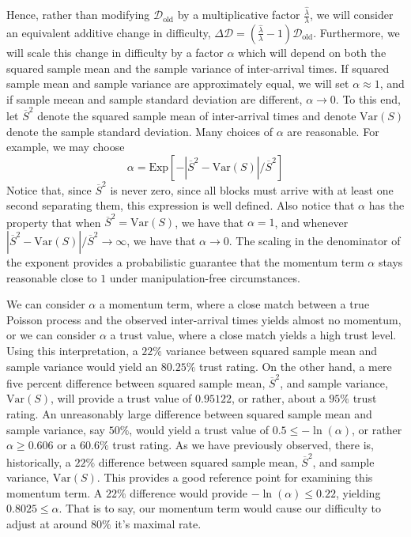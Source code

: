 \documentclass[12pt,english]{mrl}
\theoremstyle{definition}
\renewcommand{\geq}{\geqslant}
\renewcommand{\leq}{\leqslant}
\numberwithin{equation}{section}
\numberwithin{figure}{section}
\numberwithin{equation}{section}
\numberwithin{equation}{section}
\numberwithin{figure}{section}
\begin{document}
Hence, rather than modifying $\mathcal{D}_{\text{old}}$ by a multiplicative factor $\frac{\hat{\lambda}}{\lambda}$, we will consider an equivalent additive change in difficulty, $\Delta \mathcal{D} = (\frac{\hat{\lambda}}{\lambda} - 1)\mathcal{D}_{\text{old}}$. Furthermore, we will scale this change in difficulty by a factor $\alpha$ which will depend on both the squared sample mean and the sample variance of inter-arrival times. If squared sample mean and sample variance are approximately equal, we will set $\alpha \approx 1$, and if sample meean and sample standard deviation are different, $\alpha \to 0$. To this end, let $\overline{S}^2$ denote the squared sample mean of inter-arrival times and denote $\text{Var}(S)$ denote the sample standard deviation. Many choices of $\alpha$ are reasonable. For example, we may choose
\[\alpha = \text{Exp}\left[-\left|\overline{S}^2-\text{Var}(S)\right|/\overline{S}^2\right]\]
Notice that, since $\overline{S}^2$ is never zero, since all blocks must arrive with at least one second separating them, this expression is well defined. Also notice that $\alpha$ has the property that when $\overline{S}^2 = \text{Var}(S)$, we have that $\alpha = 1$, and whenever $\left|\overline{S}^2 - \text{Var}(S)\right|/\overline{S}^2 \to \infty$, we have that $\alpha \to 0$. The scaling in the denominator of the exponent provides a probabilistic guarantee that the momentum term $\alpha$ stays reasonable close to $1$ under manipulation-free circumstances.

We can consider $\alpha$ a momentum term, where a close match between a true Poisson process and the observed inter-arrival times yields almost no momentum, or we can consider $\alpha$ a trust value, where a close match yields a high trust level. Using this interpretation, a $22\%$ variance between squared sample mean and sample variance would yield an $80.25\%$ trust rating.  On the other hand, a mere five percent difference between squared sample mean, $\overline{S}^2$, and sample variance, $\text{Var}(S)$, will provide a trust value of $0.95122$, or rather, about a $95\%$ trust rating. An unreasonably large difference between squared sample mean and sample variance, say $50\%$, would yield a trust value of $0.5 \leq -\ln(\alpha)$, or rather $\alpha \geq 0.606$ or a $60.6\%$ trust rating. As we have previously observed, there is, historically, a $22\%$ difference between squared sample mean, $\overline{S}^2$, and sample variance, $\text{Var}(S)$. This provides a good reference point for examining this momentum term. A $22\%$ difference would provide $-\ln(\alpha) \leq 0.22$, yielding $0.8025 \leq \alpha$. That is to say, our momentum term would cause our difficulty to adjust at around $80\%$ it's maximal rate.
\end{document}
